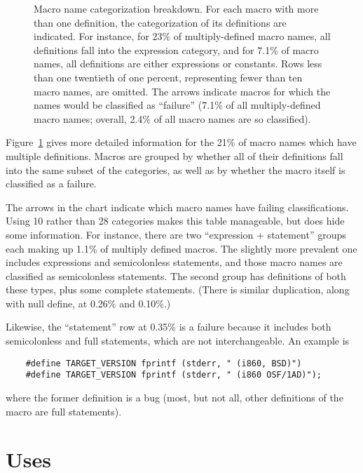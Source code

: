 \documentclass[10pt]{article}
\begin{document}
\begin{figure}
  {\small\centerline{}}
  
  \caption{Macro name categorization breakdown.  For each macro with more
    than one definition, the categorization of its definitions are
    indicated.  For instance, for 23\% of multiply-defined macro names, all
    definitions fall into the expression category, and for 7.1\% of macro
    names, all definitions are either expressions or constants.  Rows less
    than one twentieth of one percent, representing fewer than ten macro
    names, are omitted.  The arrows indicate macros for which the names
    would be classified as ``failure'' (7.1\% of all multiply-defined macro
    names; overall, 2.4\% of all macro names are so classified).}

  \label{fig:subset-categories}
\end{figure}

Figure~\ref{fig:subset-categories} gives more detailed information for the
21\% of macro names which have multiple definitions.  Macros are grouped by
whether all of their definitions fall into the same subset of the
categories, as well as by whether the macro itself is classified as a
failure.

The arrows in the chart indicate which macro names have failing
classifications.  Using 10 rather than 28 categories makes this table
manageable, but does hide some information.  For instance, 
there are two ``expression + statement'' groups each making up
1.1\% of multiply defined macros.  The slightly more prevalent one includes
expressions and semicolonless statements, and those macro names are
classified as semicolonless statements.  The second group has definitions
of both these types, plus some complete statements.  (There is similar
duplication, along with null define, at 0.26\% and 0.10\%.)

Likewise, the ``statement'' row at 0.35\% is a failure because it includes
both semicolonless and full statements, which are not interchangeable.  An
example is
\begin{verbatim}
    #define TARGET_VERSION fprintf (stderr, " (i860, BSD)")
    #define TARGET_VERSION fprintf (stderr, " (i860 OSF/1AD)");
\end{verbatim}
where the former definition is a bug (most, but not all, other definitions
of the macro are full statements).




\section{Uses}
\end{document}
